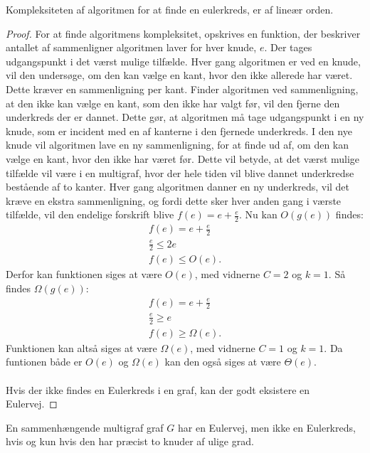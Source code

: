 \begin{thm}
Kompleksiteten af algoritmen for at finde en eulerkreds, er af lineær orden.
\end{thm}

\begin{proof}
For at finde algoritmens kompleksitet, opskrives en funktion, der beskriver antallet af sammenligner algoritmen laver for hver knude, $e$.
Der tages udgangspunkt i det værst mulige tilfælde. 
Hver gang algoritmen er ved en knude, vil den undersøge, om den kan vælge en kant, hvor den ikke allerede har været. 
Dette kræver en sammenligning per kant.
Finder algoritmen ved sammenligning, at den ikke kan vælge en kant, som den ikke har valgt før, vil den fjerne den underkreds der er dannet. 
Dette gør, at algoritmen må tage udgangspunkt i en ny knude, som er incident med en af kanterne i den fjernede underkreds.
I den nye knude vil algoritmen lave en ny sammenligning, for at finde ud af, om den kan vælge en kant, hvor den ikke har været før.
Dette vil betyde, at det værst mulige tilfælde vil være i en multigraf, hvor der hele tiden vil blive dannet underkredse bestående af to kanter. 
Hver gang algoritmen danner en ny underkreds, vil det kræve en ekstra sammenligning, og fordi dette sker hver anden gang i værste tilfælde, vil den endelige forskrift blive $f(e)=e+ \frac{e}{2}$.
Nu kan $O(g(e))$ findes:
\begin{align*}
f(e) = e+ \frac{e}{2} \\
\frac{e}{2} \leq 2e \\
f(e) \leq O(e).
\end{align*}
Derfor kan funktionen siges at være $O(e)$, med vidnerne $C=2$ og $k=1$.
Så findes $\Omega (g(e))$:
\begin{align*}
f(e) = e + \frac{e}{2} \\
\frac{e}{2} \geq e \\
f(e) \geq \Omega (e).
\end{align*}
Funktionen kan altså siges at være $\Omega (e)$, med vidnerne $C=1$ og $k=1$.
Da funtionen både er $O(e)$ og $\Omega (e)$ kan den også siges at være $\Theta (e)$.
\\\\
Hvis der ikke findes en Eulerkreds i en graf, kan der godt eksistere en Eulervej. 
\end{proof}

\begin{thm} \label{Eulervej_multigraf}
	En sammenhængende multigraf graf $G$ har en Eulervej, men ikke en Eulerkreds, hvis og kun hvis den har præcist to knuder af ulige grad.  
\end{thm} 

